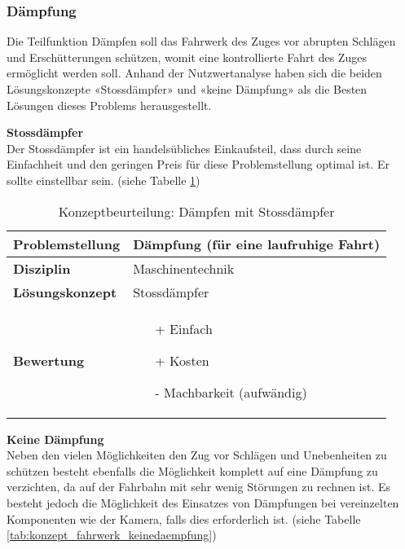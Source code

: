 \documentclass[../../main.tex]{subfiles}
\begin{document}
  \subsubsection{Dämpfung}
  Die Teilfunktion Dämpfen soll das Fahrwerk des Zuges vor abrupten Schlägen und Erschütterungen schützen, womit eine kontrollierte Fahrt des Zuges ermöglicht werden soll. Anhand der Nutzwertanalyse haben sich die beiden Lösungskonzepte «Stossdämpfer» und «keine Dämpfung» als die Besten Lösungen dieses Problems herausgestellt.

  \textbf{Stossdämpfer}\\
  Der Stossdämpfer ist ein handelsübliches Einkaufsteil, dass durch seine Einfachheit und den geringen Preis für diese Problemstellung optimal ist. Er sollte einstellbar sein. (siehe Tabelle \ref{tab:konzept_fahrwerk_stossdaempfer})

  \begin{flushleft}
    \begin{table}[h]
    \begin{tabular}{ | l | p{11cm} |}
    \hline
    \textbf{Problemstellung} & Dämpfung (für eine laufruhige Fahrt) \\ \hline
    \textbf{Disziplin} & Maschinentechnik \\ \hline
    \textbf{Lösungskonzept} & Stossdämpfer \\ \hline
    \textbf{Bewertung} &  \begin{itemize}
                            \item[+] Einfach
                            \item[+] Kosten
                            \item[-] Machbarkeit (aufwändig)
                          \end{itemize} \\ \hline
    \end{tabular}
    \caption{Konzeptbeurteilung: Dämpfen mit Stossdämpfer}
    \label{tab:konzept_fahrwerk_stossdaempfer}
\end{table}
\end{flushleft}

\textbf{Keine Dämpfung}\\
Neben den vielen Möglichkeiten den Zug vor Schlägen und Unebenheiten zu schützen besteht ebenfalls die Möglichkeit komplett auf eine Dämpfung zu verzichten, da auf der Fahrbahn mit sehr wenig Störungen zu rechnen ist. Es besteht jedoch die Möglichkeit des Einsatzes von Dämpfungen bei vereinzelten Komponenten wie der Kamera, falls dies erforderlich ist. (siehe Tabelle \ref{tab:konzept_fahrwerk_keinedaempfung})
\end{document}

